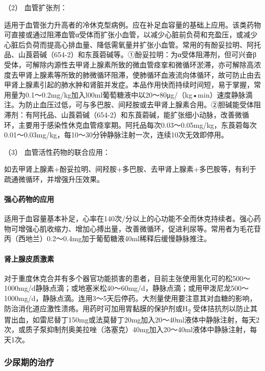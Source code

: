 \hypertarget{text00223.htmlux5cux23CHP7-7-3-2-3-2}{}
（2） 血管扩张剂：

适用于血管张力升高者的冷休克型病例。应在补足血容量的基础上应用。该类药物可直接或通过阻滞血管α受体而扩张小血管，以减少心脏前负荷和充盈压，或减少心脏后负荷而提高心排血量、降低需氧量并扩张小血管。常用的有酚妥拉明、阿托品、山莨菪碱（654-2）和东莨菪碱等。①酚妥拉明：为α受体阻滞剂，但可兴奋β受体，可解除内源性去甲肾上腺素所致的微血管痉挛和微循环淤滞，亦可解除高浓度去甲肾上腺素等所致的肺微循环阻滞，使肺循环血液流向体循环，故可防止由去甲肾上腺素引起的肺水肿和肾脏并发症。本品作用快而持续时间短，易于掌握，常用量为0.1～0.2mg/kg加入l00ml葡萄糖液中以20～80μg/（kg•min）速度静脉滴注。为防止血压过低，可与多巴胺、间羟胺或去甲肾上腺素合用。②胆碱能受体阻滞剂：有阿托品、山莨菪碱（654-2）和东莨菪碱，能扩张细小动脉，改善微循环，主要用于感染性休克血管痉挛期。阿托品每次0.03～0.05mg/kg，东莨菪每次0.01～0.03mg/kg，每10～30分钟静脉注射一次，连续10次无效即停用。

\hypertarget{text00223.htmlux5cux23CHP7-7-3-2-3-3}{}
（3） 血管活性药物的联合应用：

如去甲肾上腺素+酚妥拉明、间羟胺+多巴胺、去甲肾上腺素+多巴胺等，有利于疏通微循环，并增强升压效果。

\paragraph{强心药物的应用}

适用于血容量基本补足，心率在140次/分以上的心功能不全而休克持续者。强心药物可增强心肌收缩力、增加心搏出量，改善微循环，促进利尿等。常用者为毛花苷丙（西地兰）0.2～0.4mg加于葡萄糖液40ml稀释后缓慢静脉推注。

\paragraph{肾上腺皮质激素}

对于重度休克合并有多个器官功能损害的患者，目前主张使用氢化可的松500～1000mg/d静脉点滴；或地塞米松40～60mg/d，静脉点滴；或用甲泼尼龙500～1000mg/d，静脉点滴。连用3～5天后停药。大剂量使用要注意其对血糖的影响，防治消化道应激性溃疡。用药时可加用胃黏膜的保护剂或H\textsubscript{2}
受体拮抗剂以防止其胃出血，如雷尼替丁150mg或法莫替丁20mg加入20～40ml液体中静脉注射，每天2次，或质子泵抑制剂奥美拉唑（洛塞克）40mg加入20～40ml液体中静脉注射，每天1次。

\subsubsection{少尿期的治疗}

